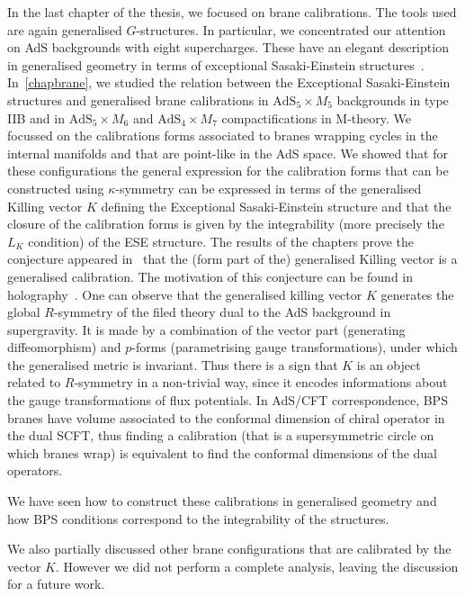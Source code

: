 \documentclass[debug]{phd}
\begin{document}
		In the last chapter of the thesis, we focused on brane calibrations.
		The tools used are again generalised $G$-structures.
		In particular, we concentrated our attention on AdS backgrounds with eight supercharges.
		These have an elegant description in generalised geometry in terms of exceptional Sasaki-Einstein structures~\cite{AshmoreESE, Grana_Ntokos}.
		In~\cref{chapbrane}, we studied the relation between the Exceptional Sasaki-Einstein structures and generalised brane calibrations in $\mathrm{AdS}_5 \times M_5$ backgrounds in type IIB and in $\mathrm{AdS}_5 \times M_6$ and $\mathrm{AdS}_4 \times M_7$ compactifications in M-theory.
		We focussed on the calibrations forms associated to branes wrapping cycles in the internal manifolds and that are point-like in the AdS space. 
		We showed that for these configurations the general expression for the calibration forms that can be constructed using $\kappa$-symmetry can be expressed in terms of the generalised Killing vector $K$ defining the Exceptional Sasaki-Einstein structure and that the closure of the calibration forms is given by the integrability (more precisely the $L_K$ condition) of the ESE structure. 
		The results of the chapters prove the conjecture appeared in~\cite{AshmoreESE} that the (form part of the) generalised Killing vector is a generalised calibration.
		The motivation of this conjecture can be found in holography~\cite{Maldacena:1997re}.
		One can observe that the generalised killing vector $K$ generates the global $R$-symmetry of the filed theory dual to the AdS background in supergravity.
		It is made by a combination of the vector part (generating diffeomorphism) and $p$-forms (parametrising gauge transformations), under which the generalised metric is invariant.
		Thus there is a sign that $K$ is an object related to $R$-symmetry in a non-trivial way, since it encodes informations about the gauge transformations of flux potentials.
		In AdS/CFT correspondence, BPS branes have volume associated to the conformal dimension of chiral operator in the dual SCFT, thus finding a calibration (that is a supersymmetric circle on which branes wrap) is equivalent to find the conformal dimensions of the dual operators.
		
		We have seen how to construct these calibrations in generalised geometry and how BPS conditions correspond to the integrability of the structures.
		
		We also partially discussed other brane configurations that are calibrated by the vector $K$.
		However we did not perform a complete analysis, leaving the discussion for a future work.
		
\end{document}
